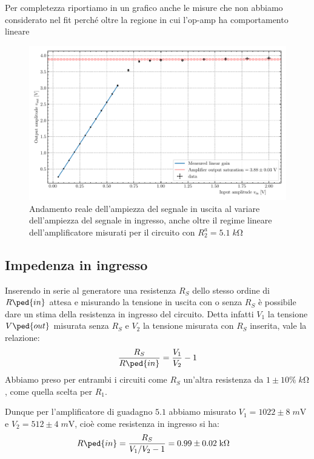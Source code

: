 \documentclass[10pt, a4paper, italian]{article}
\begin{document}
Per completezza riportiamo in un grafico anche le misure che non abbiamo
considerato nel fit perché oltre la regione in cui l'op-amp ha comportamento
lineare
\begin{figure}[htbp]
\centering
\includegraphics[scale=0.7]{gainsat}
\caption{Andamento reale dell'ampiezza del segnale in uscita al variare
dell'ampiezza del segnale in ingresso, anche oltre il regime lineare
dell'amplificatore misurati per il circuito con $R_2^a = 5.1 \; \si{k\ohm}$
\label{fig: gainsat}}
\end{figure}

\subsection{Impedenza in ingresso}
Inserendo in serie al generatore una resistenza $R_S$ dello stesso ordine di
$R\ped{in}$ attesa e misurando la tensione in uscita con o senza $R_S$ è
possibile dare un stima della resistenza in ingresso del circuito.
Detta infatti $V_1$ la tensione $V\ped{out}$ misurata senza $R_S$ e $V_2$ la
tensione misurata con $R_S$ inserita, vale la relazione:
\begin{equation}\label{eq: RS}
\frac{R_S}{R\ped{in}} = \frac{V_1}{V_2} - 1
\end{equation}
Abbiamo preso per entrambi i circuiti come $R_S$ un'altra resistenza da
$1 \pm 10\% \; \si{k\ohm}$, come quella scelta per $R_1$.

Dunque per l'amplificatore di guadagno $5.1$ abbiamo misurato
$V_1 = 1022 \pm 8 \; \si{m\V}$ e $V_2 = 512 \pm 4 \; \si{m\V}$, cioè come
resistenza in ingresso si ha:
\begin{align*}
{R\ped{in}} &= \frac{R_S}{V_1/V_2 - 1} = 0.99 \pm 0.02 \; \si{k\ohm}
\end{align*}
\end{document}
